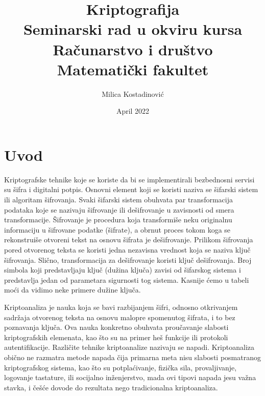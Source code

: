 \documentclass[a4paper]{article}
\begin{document}
\title{Kriptografija \\ \small{Seminarski rad u okviru kursa \\ Računarstvo i društvo\\ Matematički fakultet}}
\author{Milica Kostadinović}
\date{April 2022}

\maketitle


\tableofcontents

\newpage

\section{Uvod}
\label{sec:uvod}
Kriptografske tehnike koje se koriste da bi se implementirali bezbednosni servisi su šifra i digitalni potpis. Osnovni element koji se koristi naziva se šifarski sistem ili algoritam
šifrovanja. Svaki šifarski sistem obuhvata par transformacija podataka koje se nazivaju šifrovanje ili dešifrovanje u zavisnosti od smera transformacije. Šifrovanje je procedura koja transformiše neku originalnu informaciju u šifrovane podatke (šifrate), a obrnut proces tokom koga se rekonstruiše otvoreni tekst na osnovu šifrata je dešifrovanje.
Prilikom šifrovanja pored otvorenog teksta se koristi jedna nezavisna vrednost koja se naziva ključ šifrovanja. Slično, transformacija za dešifrovanje koristi ključ dešifrovanja. Broj simbola koji predstavljaju ključ (dužina ključa) zavisi od šifarskog sistema i predstavlja jedan od parametara sigurnosti tog sistema. Kasnije ćemo u tabeli moći da vidimo neke
primere dužine ključa.

Kriptoanaliza je nauka koja se bavi razbijanjem šifri, odnosno otkrivanjem sadržaja otvorenog teksta na osnovu malopre spomenutog šifrata, i to bez poznavanja ključa. Ova nauka konkretno obuhvata proučavanje slabosti kriptografskih elemenata, kao što su na primer heš funkcije ili protokoli autentifikacije. Različite tehnike kriptoanalize nazivaju se napadi. Kriptoanaliza obično ne razmatra metode napada čija primarna meta nisu slabosti posmatranog kriptografskog sistema, kao što su potplaćivanje, fizička sila, provaljivanje, logovanje tastature, ili socijalno inženjerstvo, mada ovi tipovi napada jesu važna stavka, i češće dovode do rezultata nego tradicionalna kriptoanaliza.
\end{document}

